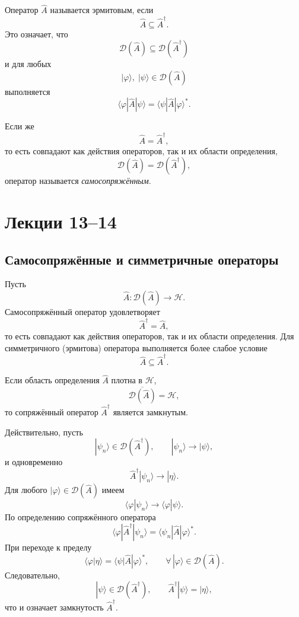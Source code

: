 \documentclass[12pt,a4paper]{article}
\begin{document}
Оператор $\hat A$ называется эрмитовым, если
\[
    \boxed{
        \hat A\subseteq\hat A^\dagger
    }.
\]
Это означает, что
\[
    \mathcal D(\hat A)
    \subseteq
    \mathcal D(\hat A^\dagger)
\]
и для любых
\[
    |\varphi\rangle,\;|\psi\rangle\in\mathcal D(\hat A)
\]
выполняется
\[
    \boxed{
        \langle\varphi|\hat A|\psi\rangle
        =
        \langle\psi|\hat A|\varphi\rangle^*
    }.
\]

Если же
\[
    \boxed{
        \hat A=\hat A^\dagger
    },
\]
то есть совпадают как действия операторов, так и их области
определения,
\[
    \boxed{
        \mathcal D(\hat A)
        =
        \mathcal D(\hat A^\dagger)
    },
\]
оператор называется \emph{самосопряжённым}.

\section{Лекции 13--14}

\subsection{Самосопряжённые и симметричные операторы}

Пусть
\[
    \hat A:\mathcal D(\hat A)\to\mathcal H.
\]
Самосопряжённый оператор удовлетворяет
\[
    \boxed{
        \hat A^\dagger=\hat A
    },
\]
то есть совпадают как действия операторов, так и их области
определения. Для симметричного (эрмитова) оператора выполняется более
слабое условие
\[
    \boxed{
        \hat A\subseteq\hat A^\dagger
    }.
\]

Если область определения $\hat A$ плотна в $\mathcal H$,
\[
    \overline{\mathcal D(\hat A)}=\mathcal H,
\]
то сопряжённый оператор $\hat A^\dagger$ является замкнутым.

Действительно, пусть
\[
    |\psi_n\rangle\in\mathcal D(\hat A^\dagger),
    \qquad
    |\psi_n\rangle\longrightarrow|\psi\rangle,
\]
и одновременно
\[
    \hat A^\dagger|\psi_n\rangle
    \longrightarrow
    |\eta\rangle.
\]
Для любого $|\varphi\rangle\in\mathcal D(\hat A)$ имеем
\[
    \langle\varphi|\psi_n\rangle
    \longrightarrow
    \langle\varphi|\psi\rangle.
\]
По определению сопряжённого оператора
\[
    \langle\varphi|\hat A^\dagger|\psi_n\rangle
    =
    \langle\psi_n|\hat A|\varphi\rangle^*.
\]
При переходе к пределу
\[
    \langle\varphi|\eta\rangle
    =
    \langle\psi|\hat A|\varphi\rangle^*,
    \qquad
    \forall\,|\varphi\rangle\in\mathcal D(\hat A).
\]
Следовательно,
\[
    |\psi\rangle\in\mathcal D(\hat A^\dagger),
    \qquad
    \hat A^\dagger|\psi\rangle=|\eta\rangle,
\]
что и означает замкнутость $\hat A^\dagger$.
\end{document}
